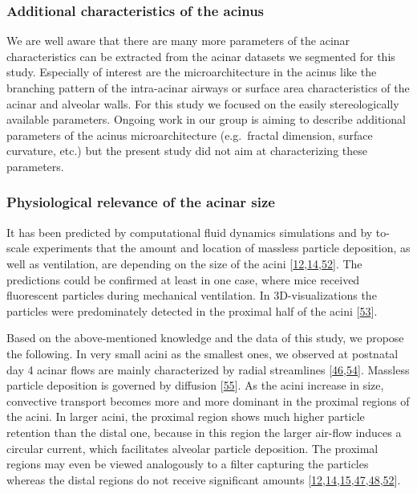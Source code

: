 \documentclass[
  american,
]{article}
\begin{document}
\hypertarget{additional-characteristics-of-the-acinus}{%
\subsubsection{Additional characteristics of the acinus}\label{additional-characteristics-of-the-acinus}}

We are well aware that there are many more parameters of the acinar characteristics can be extracted from the acinar datasets we segmented for this study.
Especially of interest are the microarchitecture in the acinus like the branching pattern of the intra-acinar airways or surface area characteristics of the acinar and alveolar walls.
For this study we focused on the easily stereologically available parameters.
Ongoing work in our group is aiming to describe additional parameters of the acinus microarchitecture (e.g.~fractal dimension, surface curvature, etc.) but the present study did not aim at characterizing these parameters.

\hypertarget{physiological-relevance-of-the-acinar-size}{%
\subsubsection{Physiological relevance of the acinar size}\label{physiological-relevance-of-the-acinar-size}}

It has been predicted by computational fluid dynamics simulations and by to-scale experiments that the amount and location of massless particle deposition, as well as ventilation, are depending on the size of the acini {[}\protect\hyperlink{ref-CVl41LwO}{12},\protect\hyperlink{ref-1DP2FRUSZ}{14},\protect\hyperlink{ref-RJ9GQcwl}{52}{]}.
The predictions could be confirmed at least in one case, where mice received fluorescent particles during mechanical ventilation.
In 3D-visualizations the particles were predominately detected in the proximal half of the acini {[}\protect\hyperlink{ref-19jBv0ima}{53}{]}.

Based on the above-mentioned knowledge and the data of this study, we propose the following.
In very small acini as the smallest ones, we observed at postnatal day 4 acinar flows are mainly characterized by radial streamlines {[}\protect\hyperlink{ref-eioib1TQ}{46},\protect\hyperlink{ref-afF83siN}{54}{]}.
Massless particle deposition is governed by diffusion {[}\protect\hyperlink{ref-k5fqLjiy}{55}{]}.
As the acini increase in size, convective transport becomes more and more dominant in the proximal regions of the acini.
In larger acini, the proximal region shows much higher particle retention than the distal one, because in this region the larger air-flow induces a circular current, which facilitates alveolar particle deposition.
The proximal regions may even be viewed analogously to a filter capturing the particles whereas the distal regions do not receive significant amounts {[}\protect\hyperlink{ref-CVl41LwO}{12},\protect\hyperlink{ref-1DP2FRUSZ}{14},\protect\hyperlink{ref-yHHhvOtP}{15},\protect\hyperlink{ref-1HOyVjqpM}{47},\protect\hyperlink{ref-OT4s1CSX}{48},\protect\hyperlink{ref-RJ9GQcwl}{52}{]}.
\end{document}
